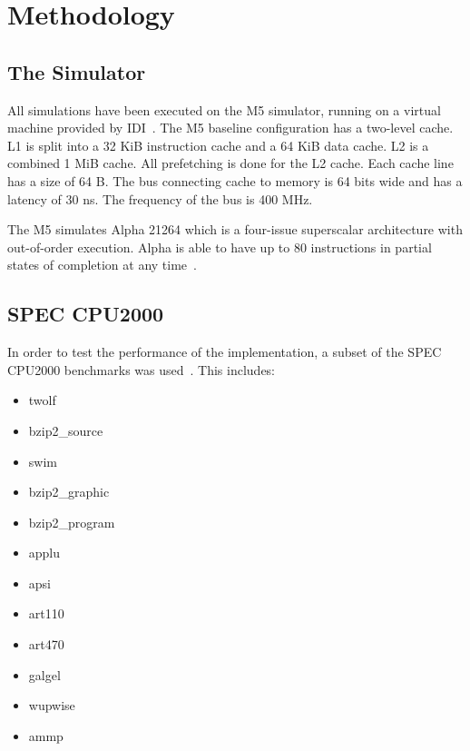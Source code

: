 \section{Methodology} %


\subsection{The Simulator}

All simulations have been executed on the M5 simulator, running on a
virtual machine provided by IDI~\cite{idi}.  The M5 baseline
configuration has a two-level cache. L1 is split into a 32 KiB
instruction cache and a 64 KiB data cache. L2 is a combined 1 MiB
cache. All prefetching is done for the L2 cache. Each cache line has a
size of 64 B. The bus connecting cache to memory is 64 bits wide and
has a latency of 30 ns. The frequency of the bus is 400 MHz.

The M5 simulates Alpha 21264 which is a four-issue superscalar
architecture with out-of-order execution. Alpha is able to have up to
80 instructions in partial states of completion at any
time~\cite{kessler_1999}.

\subsection{SPEC CPU2000}

In order to test the performance of the implementation, a subset of the SPEC
CPU2000 benchmarks was used~\cite{spec2000}. This includes:
\begin{multicols}{2}
\begin{itemize}
\item twolf
\item bzip2\_source
\item swim
\item bzip2\_graphic
\item bzip2\_program
\item applu
\item apsi
\item art110
\item art470
\item galgel
\item wupwise
\item ammp
\end{itemize}
\end{multicols}

